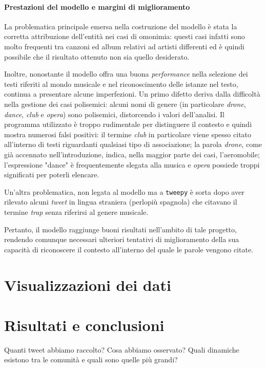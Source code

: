 \documentclass[12pt, a4paper, twocolumn]{article} %
\begin{document}
\subsection{Prestazioni del modello e margini di miglioramento}
La problematica principale emersa nella costruzione del modello è stata la corretta attribuzione dell'entità nei casi di omonimia: questi casi infatti sono molto frequenti tra canzoni ed album relativi ad artisti differenti ed è quindi possibile che il risultato ottenuto non sia quello desiderato.

Inoltre, nonostante il modello offra una buona \textit{performance} nella selezione dei testi riferiti al mondo musicale e nel riconoscimento delle istanze nel testo, continua a presentare alcune imperfezioni.
Un primo difetto deriva dalla difficoltà nella gestione dei casi polisemici: alcuni nomi di genere (in particolare \textit{drone}, \textit{dance}, \textit{club} e \textit{opera}) sono polisemici, distorcendo i valori dell'analisi.
Il programma utilizzato è troppo rudimentale per distinguere il contesto e quindi mostra numerosi falsi positivi: il termine \textit{club} in particolare viene spesso citato all'interno di testi riguardanti qualsiasi tipo di associazione; la parola \textit{drone}, come già accennato nell'introduzione, indica, nella maggior parte dei casi, l'aeromobile; l'espressione "dance" è frequentemente slegata alla musica e \textit{opera} possiede troppi significati per poterli elencare.

Un'altra problematica, non legata al modello ma a \verb|tweepy| è sorta dopo aver rilevato alcuni \textit{tweet} in lingua straniera (perlopiù spagnola) che citavano il termine \textit{trap} senza riferirsi al genere musicale.

Pertanto, il modello raggiunge buoni risultati nell'ambito di tale progetto, rendendo comunque necessari ulteriori tentativi di miglioramento della sua capacità di riconoscere il contesto all'interno del quale le parole vengono citate.

\hfill
\newpage
\part{Visualizzazioni dei dati}

\hfill
\newpage
\part{Risultati e conclusioni}
Quanti tweet abbiamo raccolto? Cosa abbiamo osservato? Quali dinamiche esistono tra le comunità e quali sono quelle più grandi?



\hfill
\newpage
\printbibliography[title={Bibliografia e sitografia}]

\end{document}
